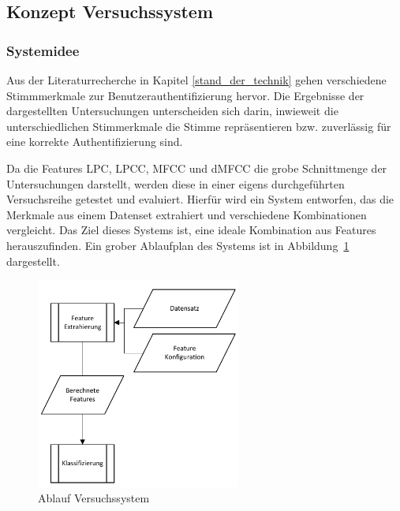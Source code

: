 \subsection{Konzept Versuchssystem}

\subsubsection{Systemidee}

Aus der Literaturrecherche in Kapitel \ref{stand_der_technik} gehen verschiedene Stimmmerkmale zur Benutzerauthentifizierung hervor.
Die Ergebnisse der dargestellten Untersuchungen unterscheiden sich darin, inwieweit die unterschiedlichen Stimmerkmale die Stimme repräsentieren bzw. zuverlässig für eine korrekte Authentifizierung sind.

Da die Features \ac{LPC}, \ac{LPCC}, \ac{MFCC} und \ac{dMFCC} die grobe Schnittmenge der Untersuchungen darstellt, werden diese in einer eigens durchgeführten Versuchsreihe getestet und evaluiert.
Hierfür wird ein System entworfen, das die Merkmale aus einem Datenset extrahiert und verschiedene Kombinationen vergleicht.
Das Ziel dieses Systems ist, eine ideale Kombination aus Features herauszufinden.
Ein grober Ablaufplan des Systems ist in Abbildung~\ref{fig:PAP_DemoSystem} dargestellt.
\begin{figure}[H]
    \centering
    \includegraphics[width=0.6\textwidth, keepaspectratio]{images/PAP_Demosystem.pdf}
    \caption{Ablauf Versuchssystem}
    \label{fig:PAP_DemoSystem}
\end{figure}


